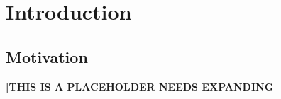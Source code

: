 \documentclass{l4proj}
\begin{document}
\educationalconsent

\tableofcontents

%
%
%
%
%
%
%
%
\chapter{Introduction}



\section{Motivation}

\textbf{[THIS IS A PLACEHOLDER NEEDS EXPANDING]}
\end{document}
